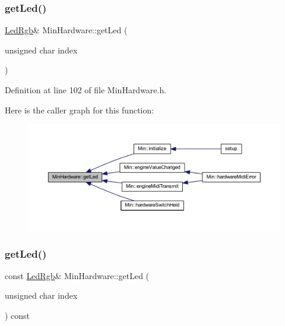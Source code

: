 \subsubsection{\texorpdfstring{get\+Led()}{getLed()}\hspace{0.1cm}{\footnotesize\ttfamily [1/2]}}
{\footnotesize\ttfamily \hyperlink{class_led_rgb}{Led\+Rgb}\& Min\+Hardware\+::get\+Led (\begin{DoxyParamCaption}\item[{unsigned char}]{index }\end{DoxyParamCaption})\hspace{0.3cm}{\ttfamily [inline]}}



Definition at line 102 of file Min\+Hardware.\+h.

Here is the caller graph for this function\+:
\nopagebreak
\begin{figure}[H]
\begin{center}
\leavevmode
\includegraphics[width=350pt]{d0/d93/class_min_hardware_a1401ae874f57cc5ce31032c8eea57fbd_icgraph}
\end{center}
\end{figure}
\mbox{\label{class_min_hardware_af0f53594d24df7d75360ccccd0f582d3}} 
\subsubsection{\texorpdfstring{get\+Led()}{getLed()}\hspace{0.1cm}{\footnotesize\ttfamily [2/2]}}
{\footnotesize\ttfamily const \hyperlink{class_led_rgb}{Led\+Rgb}\& Min\+Hardware\+::get\+Led (\begin{DoxyParamCaption}\item[{unsigned char}]{index }\end{DoxyParamCaption}) const\hspace{0.3cm}{\ttfamily [inline]}}



